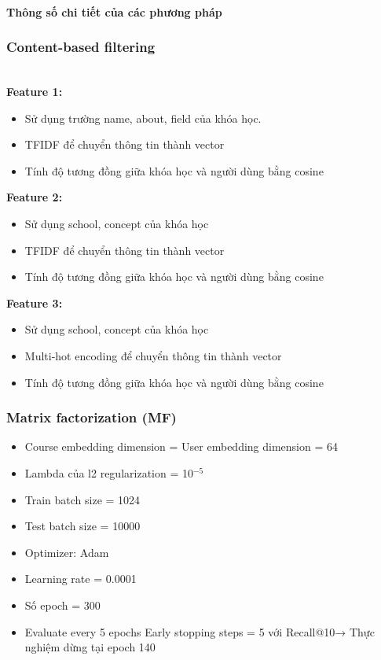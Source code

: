 \paragraph{Thông số chi tiết của các phương pháp}
\subsubsection{Content-based filtering}
\textbf{}\\
\textbf{Feature 1:} 
\begin{itemize}
    \item Sử dụng trường name, about, field của khóa học.
    \item TFIDF để chuyển thông tin thành vector
    \item Tính độ tương đồng giữa khóa học và người dùng bằng cosine
\end{itemize}
\textbf{Feature 2:}
\begin{itemize}
    \item Sử dụng school, concept của khóa học
    \item TFIDF để chuyển thông tin thành vector
    \item Tính độ tương đồng giữa khóa học và người dùng bằng cosine
\end{itemize}
\textbf{Feature 3:} 
\begin{itemize}
    \item Sử dụng school, concept của khóa học
    \item Multi-hot encoding để chuyển thông tin thành vector
    \item Tính độ tương đồng giữa khóa học và người dùng bằng cosine
\end{itemize}
\subsubsection{Matrix factorization (MF)}
\begin{itemize}
    \item Course embedding dimension = User embedding dimension = 64
    \item Lambda của l2 regularization = 10$^{-5}$
    \item Train batch size =  1024
    \item Test batch size = 10000
    \item Optimizer: Adam
    \item Learning rate = 0.0001
    \item Số epoch = 300
    \item Evaluate every 5 epochs Early stopping steps = 5 với Recall@10→ Thực nghiệm dừng tại epoch 140
\end{itemize}
